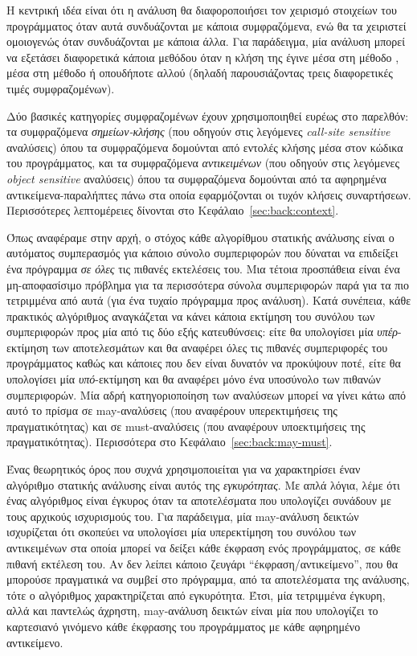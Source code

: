 Η κεντρική ιδέα είναι ότι η ανάλυση θα διαφοροποιήσει τον χειρισμό στοιχείων του προγράμματος όταν αυτά συνδυάζονται με κάποια συμφραζόμενα, ενώ θα τα χειριστεί ομοιογενώς όταν συνδυάζονται με κάποια άλλα. Για παράδειγμα, μία ανάλυση μπορεί να εξετάσει διαφορετικά κάποια μεθόδου όταν η κλήση της έγινε μέσα στη μέθοδο , μέσα στη μέθοδο  ή οπουδήποτε αλλού (δηλαδή παρουσιάζοντας τρεις διαφορετικές τιμές συμφραζομένων).

Δύο βασικές κατηγορίες συμφραζομένων έχουν χρησιμοποιηθεί ευρέως στο παρελθόν: τα συμφραζόμενα \emph{σημείων-κλήσης} (που οδηγούν στις λεγόμενες {\en \emph{call-site sensitive}} αναλύσεις) όπου τα συμφραζόμενα δομούνται από εντολές κλήσης μέσα στον κώδικα του προγράμματος, και τα συμφραζόμενα \emph{αντικειμένων} (που οδηγούν στις λεγόμενες {\en \emph{object sensitive}} αναλύσεις) όπου τα συμφραζόμενα δομούνται από τα αφηρημένα αντικείμενα-παραλήπτες πάνω στα οποία εφαρμόζονται οι τυχόν κλήσεις συναρτήσεων. Περισσότερες λεπτομέρειες δίνονται στο Κεφάλαιο~\ref{sec:back:context}.


Όπως αναφέραμε στην αρχή, ο στόχος κάθε αλγορίθμου στατικής ανάλυσης είναι ο αυτόματος συμπερασμός για κάποιο σύνολο συμπεριφορών που δύναται να επιδείξει ένα πρόγραμμα \emph{σε όλες} τις πιθανές εκτελέσεις του. Μια τέτοια προσπάθεια είναι ένα μη-αποφασίσιμο πρόβλημα για τα περισσότερα σύνολα συμπεριφορών παρά για τα πιο τετριμμένα από αυτά (για ένα τυχαίο πρόγραμμα προς ανάλυση). Κατά συνέπεια, κάθε πρακτικός αλγόριθμος αναγκάζεται να κάνει κάποια εκτίμηση του συνόλου των συμπεριφορών προς μία από τις δύο εξής κατευθύνσεις: είτε θα υπολογίσει μία \emph{υπέρ}-εκτίμηση των αποτελεσμάτων και θα αναφέρει όλες τις πιθανές συμπεριφορές του προγράμματος καθώς και κάποιες που δεν είναι δυνατόν να προκύψουν ποτέ, είτε θα υπολογίσει μία \emph{υπό}-εκτίμηση και θα αναφέρει μόνο ένα υποσύνολο των πιθανών συμπεριφορών. Μία αδρή κατηγοριοποίηση των αναλύσεων μπορεί να γίνει κάτω από αυτό το πρίσμα σε {\en may}-αναλύσεις (που αναφέρουν υπερεκτιμήσεις της πραγματικότητας) και σε {\en must}-αναλύσεις (που αναφέρουν υποεκτιμήσεις της πραγματικότητας). Περισσότερα στο Κεφάλαιο~\ref{sec:back:may-must}.


Ένας θεωρητικός όρος που συχνά χρησιμοποιείται για να χαρακτηρίσει έναν αλγόριθμο στατικής ανάλυσης είναι αυτός της \emph{εγκυρότητας}. Με απλά λόγια, λέμε ότι ένας αλγόριθμος είναι έγκυρος όταν τα αποτελέσματα που υπολογίζει συνάδουν με τους αρχικούς ισχυρισμούς του. Για παράδειγμα, μία {\en may}-ανάλυση δεικτών ισχυρίζεται ότι σκοπεύει να υπολογίσει μία υπερεκτίμηση του συνόλου των αντικειμένων στα οποία μπορεί να δείξει κάθε έκφραση ενός προγράμματος, σε κάθε πιθανή εκτέλεση του. Αν δεν λείπει κάποιο ζευγάρι ``έκφραση/αντικείμενο'', που θα μπορούσε πραγματικά να συμβεί στο πρόγραμμα, από τα αποτελέσματα της ανάλυσης, τότε ο αλγόριθμος χαρακτηρίζεται από εγκυρότητα. Έτσι, μία τετριμμένα έγκυρη, αλλά και παντελώς άχρηστη, {\en may}-ανάλυση δεικτών είναι μία που υπολογίζει το καρτεσιανό γινόμενο κάθε έκφρασης του προγράμματος με κάθε αφηρημένο αντικείμενο.

